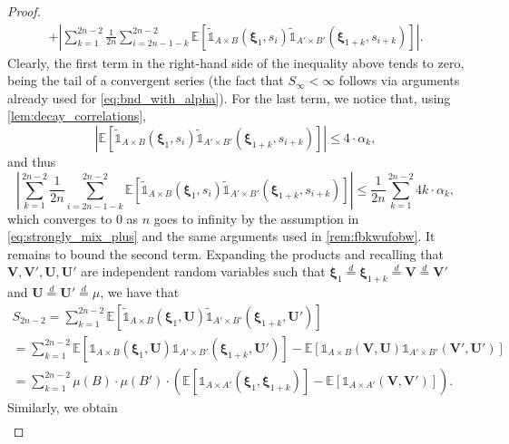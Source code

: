 \documentclass[11pt,a4paper,oneside]{article}
\theoremstyle{definition}
\theoremstyle{remark}
\def\E{\mathbb{E}}
\begin{document}
\begin{proof}
\begin{multline}
	+  \left|	\sum_{k=1}^{2n-2}  	\frac{1}{2n} \sum_{i=2n-1-k}^{2n-2}  \E \left[ \tilde{\mathds{1}}_{A \times B}\left(\bm \xi_1,s_i\right) \tilde{\mathds{1}}_{A' \times B'}\left(\bm \xi_{1+k},s_{i+k}\right)  \right] \right|.
	\end{multline}
	Clearly, the first term in the right-hand side of the inequality above tends to zero, being the tail of a convergent series (the fact that $S_{\infty}<\infty$ follows via arguments already used for \cref{eq:bnd_with_alpha}). For the last term, we notice that, using \cref{lem:decay_correlations},
	\begin{equation}
		\left| \E \left[ \tilde{\mathds{1}}_{A \times B}\left(\bm \xi_1,s_i\right) \tilde{\mathds{1}}_{A' \times B'}\left(\bm \xi_{1+k},s_{i+k}\right)  \right] \right| \leq 4 \cdot \alpha_k,
	\end{equation}
	and thus
	\begin{equation}
	 \left|	\sum_{k=1}^{2n-2}  	\frac{1}{2n} \sum_{i=2n-1-k}^{2n-2}  \E \left[ \tilde{\mathds{1}}_{A \times B}\left(\bm \xi_1,s_i\right) \tilde{\mathds{1}}_{A' \times B'}\left(\bm \xi_{1+k},s_{i+k}\right)  \right] \right| \leq \frac{1}{2n}	\sum_{k=1}^{2n-2}  4 k \cdot \alpha_k,
	\end{equation}
	which converges to $0$ as $n$ goes to infinity by the assumption in \cref{eq:strongly_mix_plus} and the same arguments used in \cref{rem:fbkwufobw}.
	It remains to bound the second term. Expanding the products and recalling that $\bm V, \bm V', \bm U, \bm U'$ are independent random variables such that $\bm{\xi}_{1}\stackrel{d}{=}\bm{\xi}_{1+k}\stackrel{d}{=}\bm {V}\stackrel{d}{=}\bm {V}'$ and $\bm {U}\stackrel{d}{=}\bm {U}'\stackrel{d}{=}\mu$, we have that
	\begin{multline}
	S_{2n-2}=\sum_{k=1}^{2n-2} \E\left[ \tilde {\mathds{1}}_{A \times B}(\bm{\xi}_1, \bm U)   \tilde {\mathds{1}}_{A' \times B'} (\bm{\xi}_{1+k}, \bm U') \right]\\
	=
	\sum_{k=1}^{2n-2} \E\left[  \mathds{1}_{A \times B}(\bm{\xi}_1, \bm U)  \mathds{1}_{A' \times B'} (\bm{\xi}_{1+k}, \bm U') \right]-\E\left[  \mathds{1}_{A \times B}(\bm V, \bm U)  \mathds{1}_{A' \times B'} (\bm{V}', \bm U') \right]\\
	=
	\sum_{k=1}^{2n-2} \mu \left(B\right) \cdot \mu \left(B'\right) \cdot
	\left(\E\left[  \mathds{1}_{A \times A'}(\bm{\xi}_1,\bm{\xi}_{1+k} )\right]-\E\left[  \mathds{1}_{A \times A'}(\bm V,\bm{V}') \right]\right).
	\end{multline}
	Similarly, we obtain 
	\begin{multline}

\end{multline}
\end{proof}
\end{document}
